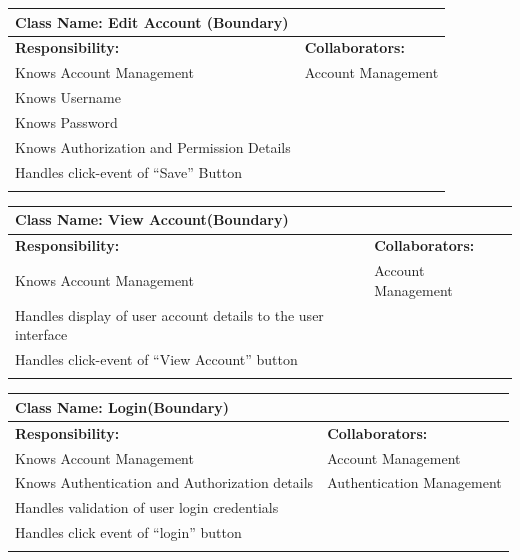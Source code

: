 \documentclass[]{article}
\begin{document}
	\begin{table}[ht]
		\centering
		\begin{tabular}{|p{7cm}|p{7cm}|}
		\hline 
		 \multicolumn{2}{|l|}{\textbf{Class Name:} Edit Account (Boundary)} \\
		\hline
		\textbf{Responsibility:} & \textbf{Collaborators:} \\
		\hline
			Knows Account Management & Account Management\\
			Knows Username &\\
			Knows Password &\\
			Knows Authorization and Permission Details &\\
			Handles click-event of “Save” Button &\\
		\vspace{0.1in} & \\
		\hline
		\end{tabular}
	\end{table}

	\begin{table}[ht]
		\centering
		\begin{tabular}{|p{7cm}|p{7cm}|}
		\hline 
		 \multicolumn{2}{|l|}{\textbf{Class Name:} View Account(Boundary)} \\
		\hline
		\textbf{Responsibility:} & \textbf{Collaborators:} \\
		\hline
			Knows Account Management & Account Management \\
			Handles display of user account details to the user interface &\\
			Handles click-event of “View Account” button &\\
		\vspace{0.1in} & \\
		\hline
		\end{tabular}
	\end{table}

	\begin{table}[ht]
		\centering
		\begin{tabular}{|p{7cm}|p{7cm}|}
		\hline 
		 \multicolumn{2}{|l|}{\textbf{Class Name:} Login(Boundary)} \\
		\hline
		\textbf{Responsibility:} & \textbf{Collaborators:} \\
		\hline
			Knows Account Management & Account Management\\
			Knows Authentication and Authorization details & Authentication Management\\
			Handles validation of user login credentials &\\
			Handles click event of “login” button &\\
		\vspace{0.1in} & \\
		\hline
		\end{tabular}
	\end{table}
\end{document}

